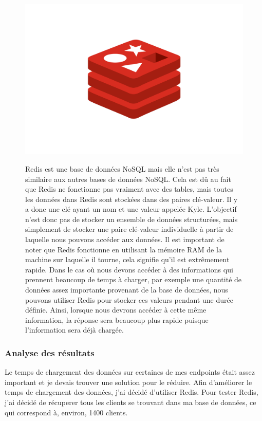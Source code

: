 \begin{figure}[H]
    \begin{minipage}{.3\textwidth}
      \includegraphics[width=1\linewidth]{img/redis.png}
    \end{minipage}
    \begin{minipage}{.7\textwidth}
Redis est une base de données NoSQL mais elle n'est pas très similaire aux autres bases de données NoSQL. Cela est dû au fait que Redis ne fonctionne pas vraiment avec des tables, mais toutes les données dans Redis sont stockées dans des paires clé-valeur. 
Il y a donc une clé ayant un nom et une valeur appelée Kyle.
L'objectif n'est donc pas de stocker un ensemble de données structurées, mais simplement de stocker une paire clé-valeur individuelle à partir de laquelle nous pouvons accéder aux données.
Il est important de noter que Redis fonctionne en utilisant la mémoire RAM de la machine sur laquelle il tourne, cela signifie qu'il est extrêmement rapide.
\newpara
Dans le cas où nous devons accéder à des informations qui prennent beaucoup de temps à charger, par exemple une quantité de données assez importante provenant de la base de données, nous pouvons utiliser Redis pour stocker ces valeurs pendant une durée définie. Ainsi, lorsque nous devrons accéder à cette même information, la réponse sera beaucoup plus rapide puisque l'information sera déjà chargée.
\end{minipage}
\end{figure}
\subsubsection{Analyse des résultats}
Le temps de chargement des données sur certaines de mes endpoints était assez important et je devais trouver une solution pour le réduire. 
Afin d'améliorer le temps de chargement des données, j'ai décidé d'utiliser Redis. 
Pour tester Redis, j'ai décidé de récuperer tous les clients se trouvant dans ma base de données, ce qui correspond à, environ, 1400 clients.


